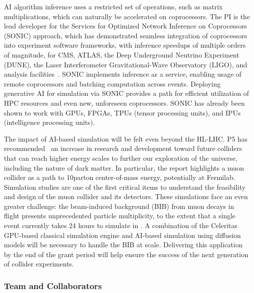 AI algorithm inference uses a restricted set of operations, such as matrix multiplications, which can naturally be accelerated on coprocessors.
The PI is the lead developer for the Services for Optimized Network Inference on Coprocessors (SONIC) approach,
which has demonstrated seamless integration of coprocessors into experiment software frameworks, with inference speedups of multiple orders of magnitude,
for CMS, ATLAS, the Deep Underground Neutrino Experiment (DUNE), the Laser Interferometer Gravitational-Wave Observatory (LIGO), and analysis facilities~\cite{Duarte:2019fta,Krupa:2020bwg,Wang:2020fjr,Rankin:2020usv,Gunny:2021gne,Cai:2023ldc,CMS:2024twn,Savard:2023wwi}.
SONIC implements inference as a service, enabling usage of remote coprocessors and batching computation across events.
Deploying generative AI for simulation via SONIC provides a path for efficient utilization of HPC resources and even new, unforeseen coprocessors.
SONIC has already been shown to work with GPUs, FPGAs, TPUs (tensor processing units), and IPUs (intelligence processing units).

The impact of AI-based simulation will be felt even beyond the HL-LHC.
P5 has recommended~\cite{P5:2023} an increase in research and development toward future colliders that can reach higher energy scales
to further our exploration of the universe, including the nature of dark matter.
In particular, the report highlights a muon collider as a path to 10\TeV parton center-of-mass energy, potentially at Fermilab.
Simulation studies are one of the first critical items to understand the feasibility and design of the muon collider and its detectors.
These simulations face an even greater challenge: the beam-induced background (BIB) from muon decays in flight presents unprecedented particle multiplicity,
to the extent that a single event currently takes 24 hours to simulate in \GEANTfour.
A combination of the Celeritas GPU-based classical simulation engine and AI-based simulation using diffusion models will be necessary to handle the BIB at scale.
Delivering this application by the end of the grant period will help ensure the success of the next generation of collider experiments.

\subsubsection{Team and Collaborators}\label{subsec:simteam}

